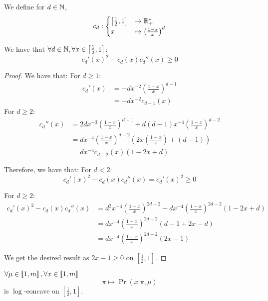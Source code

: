 \begin{lemma}
    \label{lemma:cd_log_concave_compatible}
    We define for $d \in \mathbb{N}$,
    \[ c_d: \begin{cases}
        \left[\frac{1}{2}, 1\right] &\rightarrow \mathbb{R}_+^*\\
        x &\mapsto \left(\frac{1 - x}{x}\right)^d
    \end{cases}\]

    We have that $\forall d \in \mathbb{N}, \forall x \in \left[\frac{1}{2}, 1\right]$:
    \[ c_d'(x)^2 - c_d(x) c_d''(x) \geq 0 \]
\end{lemma} 
\begin{proof}
    We have that:
    For $d \geq 1$:
    \begin{align}
        c_d'(x) &= -d x^{-2} \left(\frac{1 - x}{x}\right)^{d - 1}\\
        &= -d x^{-2} c_{d - 1}(x)
    \end{align}
    For $d \geq 2$:
    \begin{align}
        c_d''(x) 
        &= 2d x^{-3} \left(\frac{1 - x}{x}\right)^{d - 1} +  d(d-1) x^{-4} \left(\frac{1 - x}{x}\right)^{d - 2} \\
        &= d x^{-4} \left(\frac{1 - x}{x}\right)^{d - 2} \left(2 x\left(\frac{1 - x}{x}\right) + (d - 1)\right) \\
        &= d x^{-4} c_{d - 2}(x) \left(1 - 2x + d\right)
    \end{align}

    Therefore, we have that:
    For $d < 2$:
    \begin{equation}
        c_d'(x)^2 - c_d(x) c_d''(x) = c_d'(x)^2 \geq 0
    \end{equation}

    For $d \geq 2$:
    \begin{align}
        c_d'(x)^2 - c_d(x) c_d''(x) 
        &= d^2 x^{-4} \left(\frac{1 - x}{x}\right)^{2d - 2} - d x^{-4} \left(\frac{1 - x}{x}\right)^{2d - 2} \left(1 - 2x + d\right)\\
        &= d x^{-4} \left(\frac{1 - x}{x}\right)^{2d - 2} \left(d - 1 + 2x - d\right)\\
        &= d x^{-4} \left(\frac{1 - x}{x}\right)^{2d - 2} \left(2x - 1\right)
    \end{align}

    We get the desired result as $2x - 1 \geq 0$ on $\left[\frac{1}{2}, 1\right]$.
\end{proof}


\begin{thm}
    \label{thm:log_likelihood_concave_appendix}
    $\forall \mu \in \left\llbracket1, m\right\rrbracket, \forall x \in \left\llbracket1, m\right\rrbracket$
    \[ \pi \mapsto \Pr(x | \pi, \mu) \]
    is $\log$-concave on $\left[\frac{1}{2}, 1\right]$.
\end{thm}

